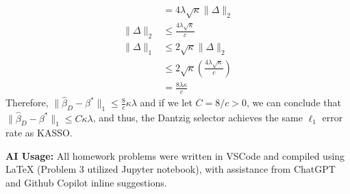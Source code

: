 \documentclass[11pt,a4paper,margin=1in]{article}
\begin{document}
\begin{enumerate}[(a)]
\begin{align*}
        &= 4\lambda\sqrt{\kappa}\|\Delta\|_2 \\
        \|\Delta\|_2 &\leq \frac{4\lambda\sqrt{\kappa}}{c} \\
        \|\Delta\|_1 &\leq 2\sqrt{\kappa}\|\Delta\|_2 \\
        &\leq 2\sqrt{\kappa}\left(\frac{4\lambda\sqrt{\kappa}}{c}\right) \\
        &= \frac{8\lambda\kappa}{c}
    \end{align*}
    Therefore, $\|\hat{\beta}_D - \beta^*\|_1 \leq \frac{8}{c}\kappa\lambda$ and
    if we let $C = 8/c > 0$, we can conclude that $\|\hat{\beta}_D - \beta^*\|_1 \leq C\kappa\lambda$,
    and thus, the Dantzig selector achieves the same $\ell_1$ error rate as KASSO.
\end{enumerate}



\noindent 
\textbf{AI Usage:} All homework problems were written in VSCode and compiled using LaTeX
(Problem 3 utilized Jupyter notebook), with assistance from ChatGPT and Github 
Copilot inline suggestions.
\end{document}
